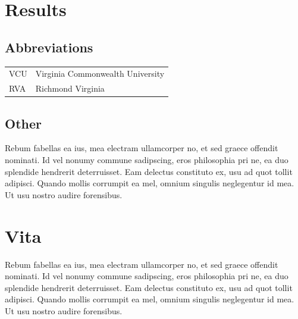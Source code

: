 \documentclass[copyright, reqno]{vcuthesis}
\numberwithin{equation}{chapter}
\begin{document}
\chapter{Results \label{chap:resultschap}}

\begin{appendices}
\chapter{Abbreviations}
\begin{tabular}{l p{4.5cm}}
VCU &Virginia Commonwealth University \\
RVA & Richmond Virginia \\
\end{tabular}
\end{appendices}

\begin{appendices}
\chapter{Other}
Rebum fabellas ea ius, mea electram ullamcorper no, et sed graece offendit nominati. Id vel nonumy commune sadipscing, eros philosophia pri ne, ea duo splendide hendrerit deterruisset. Eam delectus constituto ex, usu ad quot tollit adipisci. Quando mollis corrumpit ea mel, omnium singulis neglegentur id mea. Ut usu nostro audire forensibus.
\end{appendices}

\printbibliography[title=References]

\chapter*{Vita}
\thispagestyle{plain}
Rebum fabellas ea ius, mea electram ullamcorper no, et sed graece offendit nominati. Id vel nonumy commune sadipscing, eros philosophia pri ne, ea duo splendide hendrerit deterruisset. Eam delectus constituto ex, usu ad quot tollit adipisci. Quando mollis corrumpit ea mel, omnium singulis neglegentur id mea. Ut usu nostro audire forensibus.
\end{document}
